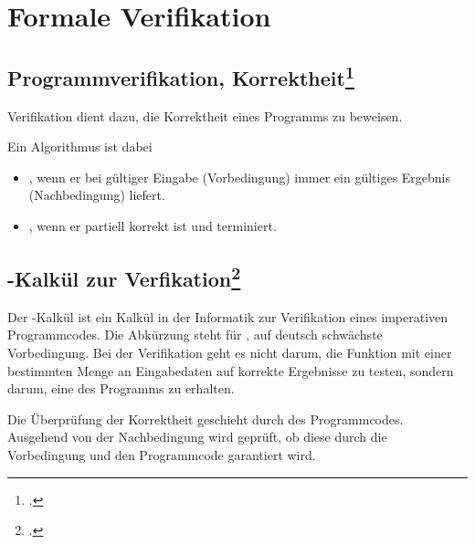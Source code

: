 \documentclass{lehramt-informatik}
\begin{document}

\chapter{Formale Verifikation}

%

\section{Programmverifikation, Korrektheit\footcite[Seite 14]{sosy:fs:5}}

Verifikation dient dazu, die Korrektheit eines Programms
 zu beweisen.

Ein Algorithmus ist dabei

\begin{itemize}

\item {}, wenn er bei gültiger Eingabe
(Vorbedingung) immer ein gültiges Ergebnis (Nachbedingung) liefert.

\item {}, wenn er partiell korrekt ist und terminiert.
\end{itemize}

%

\section{-Kalkül zur Verfikation\footcite[Seite 15]{sosy:fs:5}}

Der -Kalkül ist ein Kalkül in der Informatik zur Verifikation
eines imperativen Programmcodes. Die Abkürzung  steht für
, auf deutsch schwächste Vorbedingung. Bei
der Verifikation geht es nicht darum, die Funktion mit einer bestimmten
Menge an Eingabedaten auf korrekte Ergebnisse zu testen, sondern darum,
eine  des
Programms zu erhalten.

Die Überprüfung der Korrektheit geschieht durch 
des Programmcodes. Ausgehend von der Nachbedingung wird geprüft, ob
diese durch die Vorbedingung und den Programmcode garantiert wird.
\end{document}
